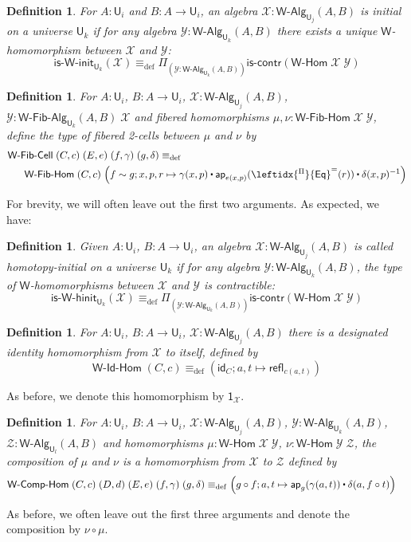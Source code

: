 \documentclass[reqno,10pt,a4paper,oneside]{amsart}
\numberwithin{equation}{section}
\theoremstyle{mythm}
\theoremstyle{mydef}
\newtheorem{definition}[theorem]{Definition}
\theoremstyle{myrmk}
\newcommand{\deq}{\equiv}
\newcommand{\defeq}{\deq_{\mathrm{def}}}
\newcommand{\idfun}[1]{\mathsf{id}_{#1}}
\newcommand{\comp}{\circ}
\newcommand{\iscontr}{\mathsf{is}\text{-}\mathsf{contr}}
\newcommand{\ct}{%
  \mathchoice{\mathbin{\raisebox{0.5ex}{$\displaystyle\centerdot$}}}%
             {\mathbin{\raisebox{0.5ex}{$\centerdot$}}}%
             {\mathbin{\raisebox{0.25ex}{$\scriptstyle\,\centerdot\,$}}}%
             {\mathbin{\raisebox{0.1ex}{$\scriptscriptstyle\,\centerdot\,$}}}}
\newcommand{\funext}{\leftidx{^\Pi}{\mathsf{Eq}}^{=}}
\newcommand{\prd}[1]{\Pi_{#1}}
\newcommand{\app}{\mathsf{ap}}
\newcommand{\refl}{\mathsf{refl}}
\newcommand{\W}{\mathsf{W}}
\newcommand{\one}{\mathsf{1}}
\newcommand{\UU}{\mathsf{U}}
\newcommand{\WFibCell}{\mathsf{W}\text{-}\mathsf{Fib}\text{-}\mathsf{Cell}}
\newcommand{\WAlg}{\mathsf{W}\text{-}\mathsf{Alg}}
\newcommand{\WFibAlg}{\mathsf{W}\text{-}\mathsf{Fib}\text{-}\mathsf{Alg}}
\newcommand{\WHom}{\mathsf{W}\text{-}\mathsf{Hom}}
\newcommand{\WFibHom}{\mathsf{W}\text{-}\mathsf{Fib}\text{-}\mathsf{Hom}}
\newcommand{\IsWInit}{\mathsf{is}\text{-}\mathsf{\W}\text{-}\mathsf{init}}
\newcommand{\IsWHInit}{\mathsf{is}\text{-}\mathsf{\W}\text{-}\mathsf{hinit}}
\newcommand{\WIdHom}{\mathsf{W}\text{-}\mathsf{Id}\text{-}\mathsf{Hom}}
\newcommand{\WCompHom}{\mathsf{W}\text{-}\mathsf{Comp}\text{-}\mathsf{Hom}}
\newcommand{\X}{\mathcal{X}}
\newcommand{\Y}{\mathcal{Y}}
\newcommand{\Z}{\mathcal{Z}}
\begin{document}
\begin{definition}\label{def:WInit}
For $A:\UU_i$ and $B : A \to \UU_i$, an algebra $\X : \WAlg_{\UU_j}(A,B)$ is \emph{initial} on a universe $\UU_k$ if for any algebra $\Y : \WAlg_{\UU_k}(A,B)$ there exists a unique $\W$-homomorphism between $\X$ and $\Y$:
\[ \IsWInit_{\UU_k}(\X) \defeq \prd{(\Y:\WAlg_{\UU_k}(A,B))} \iscontr(\WHom \; \X \; \Y) \]  
\end{definition}




\begin{definition}\label{def:WFibCell}
For $A:\UU_i$, $B : A \to \UU_i$, $\X : \WAlg_{\UU_j}(A,B)$, $\Y : \WFibAlg_{\UU_k}(A,B) \; \X$ and fibered homomorphisms $\mu, \nu : \WFibHom \; \X \; \Y$, define the type of \emph{fibered 2-cells} between $\mu$ and $\nu$ by
\begin{align*} & \WFibCell \; (C,c) \; (E, e) \; (f,\gamma) \; (g,\delta) \defeq \\ & \;\;\; \;\;\;\WFibHom \; (C,c) \; \Big(f \sim g; x,p,r \mapsto \gamma(x,p) \ct \app_{e(x,p)}(\funext(r)) \ct \delta(x,p)^{-1}\Big)
\end{align*}
\end{definition}
For brevity, we will often leave out the first two arguments. As expected, we have:
\begin{definition}\label{def:WHInit}
Given $A:\UU_i$, $B : A \to \UU_i$, an algebra $\X : \WAlg_{\UU_j}(A,B)$ is called \emph{homotopy-initial} on a universe $\UU_k$ if for any algebra $\Y : \WAlg_{\UU_k}(A,B)$, the type of $\W$-homomorphisms between $\X$ and $\Y$ is contractible:
\[ \IsWHInit_{\UU_k}(\X) \defeq \prd{(\Y:\WAlg_{\UU_k}(A,B))} \iscontr(\WHom \; \X \; \Y) \]  
\end{definition}

\begin{definition}
For $A:\UU_i$, $B : A \to \UU_i$, $\X : \WAlg_{\UU_j}(A,B)$ there is a designated \emph{identity} homomorphism from $\X$ to itself, defined by
\[ \WIdHom \; (C,c) \defeq (\idfun{C}; a,t \mapsto \refl_{c(a,t)}) \]
\end{definition}
As before, we denote this homomorphism by $\one_\X$.

\begin{definition}
For $A:\UU_i$, $B : A \to \UU_i$, $\X : \WAlg_{\UU_j}(A,B)$, $\Y : \WAlg_{\UU_k}(A,B)$, $\Z : \WAlg_{\UU_l}(A,B)$ and homomorphisms $\mu : \WHom \; \X \; \Y$, $\nu : \WHom \; \Y \; \Z$, the \emph{composition} of $\mu$ and $\nu$ is a homomorphism from $\X$ to $\Z$ defined by
\begin{align*} & \WCompHom \; (C,c) \; (D,d) \; (E,e) \; (f,\gamma) \; (g,\delta) \defeq  \Big(g \comp f; a,t \mapsto \app_g(\gamma(a,t)) \ct \delta(a, f \comp t) \Big)
\end{align*}
\end{definition}
As before, we often leave out the first three arguments and denote the composition by $\nu \comp \mu$.
\end{document}
